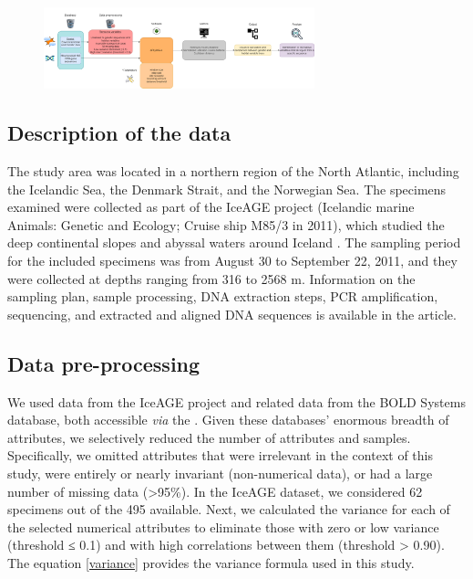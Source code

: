 \begin{figure}[htbp]
    \centering
    \includegraphics[width=0.7\textwidth]{diagram.drawio}
    \caption{\label{fig:fig1}}
\end{figure}

\subsection{Description of the data}
The study area was located in a northern region of the North Atlantic, including the Icelandic Sea, the Denmark Strait, and the Norwegian Sea. The specimens examined were collected as part of the IceAGE project (Icelandic marine Animals: Genetic and Ecology; Cruise ship M85/3 in 2011), which studied the deep continental slopes and abyssal waters around Iceland \citep{meisner_prefacebiodiversity_2018}. The sampling period for the included specimens was from August 30 to September 22, 2011, and they were collected at depths ranging from 316 to 2568 m. Information on the sampling plan, sample processing, DNA extraction steps, PCR amplification, sequencing, and extracted and aligned DNA sequences is available in the \citep{uhlir_adding_2021} article.

\subsection{Data pre-processing}
We used data from the IceAGE project and related data from the BOLD Systems database, both accessible \emph{via} the \citep{uhlir_adding_2021}. Given these databases' enormous breadth of attributes, we selectively reduced the number of attributes and samples. Specifically, we omitted attributes that were irrelevant in the context of this study, were entirely or nearly invariant (non-numerical data), or had a large number of missing data (>95\%). In the IceAGE dataset, we considered 62 specimens out of the 495 available. Next, we calculated the variance for each of the selected numerical attributes to eliminate those with zero or low variance (threshold ≤ 0.1) and with high correlations between them (threshold > 0.90). The equation \ref{variance} provides the variance formula used in this study.

